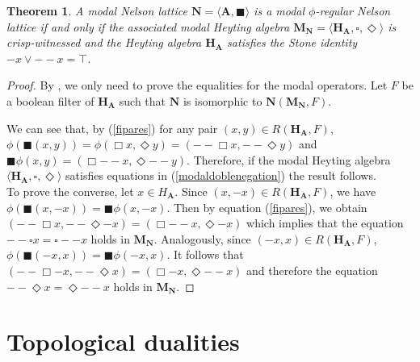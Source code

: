 \documentclass[pdflatex,sn-mathphys-num]{sn-jnl}%
\newcommand{\A}{\mathbf{A}}
\newcommand{\He}{\mathbf{H}}
\theoremstyle{thmstyleone}%
\newtheorem{theorem}{Theorem}%
\theoremstyle{thmstyletwo}%
\theoremstyle{thmstylethree}%
\begin{document}
\begin{theorem} \label{CharRegNelsonlattice}
A modal Nelson lattice $\mathbf{N}=\langle \A,\blacksquare\rangle $ is a modal $\phi$-regular Nelson lattice if and only if the associated modal Heyting algebra $\mathbf{M}_\mathbf{N}=\langle \He_\A,\square,\Diamond\rangle$ is crisp-witnessed and the Heyting algebra $\He_\A$ satisfies the Stone identity $-x \vee --x = \top$.
\end{theorem}

\begin{proof}
By \cite[Theorem 5.12]{Busaniche}, we only need to prove the equalities for the modal operators. Let $F$ be a boolean filter of $\He_\A$ such that $\mathbf{N}$ is isomorphic to $\mathbf{N}(\mathbf{M}_\mathbf{N},F)$. 

We can see that, by (\ref{fipares}) for any pair  $(x,y)\in R(\He_\A,F)$, $\phi(\blacksquare (x,y)) = \phi(\Box x,\Diamond y) = (- - \Box x, - -\Diamond y)$  and 
$\blacksquare \phi(x,y) = (\Box- - x, \Diamond - - y)$. Therefore, if the modal Heyting algebra $\langle \He_\A,\square,\Diamond\rangle$ satisfies equations in (\ref{modaldoblenegation}) the result follows.\\
To prove the converse, let $x\in H_\A$. Since $(x,-x)\in R(\He_\A,F)$, we have $\phi(\blacksquare (x,-x)) = \blacksquare \phi(x,-x)$. Then by equation (\ref{fipares}), we obtain $(- - \Box x, - -\Diamond -x)= (\Box- - x, \Diamond - x)$ which implies that the equation $--\square x=\square --x$ holds in $\mathbf{M}_\mathbf{N}$. Analogously, since $(-x,x)\in R(\He_\A,F)$, $\phi(\blacksquare (-x,x)) = \blacksquare \phi(-x,x)$. It follows that $(- - \Box -x, - -\Diamond x)= (\Box-  x, \Diamond -- x)$ and therefore the equation $-- \Diamond x=\Diamond --x$ holds in $\mathbf{M}_\mathbf{N}$.
\end{proof}



\section{Topological dualities}\label{sec6}
\end{document}
